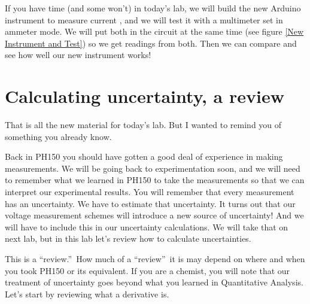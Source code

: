 If you have time (and some won't) in today's lab, we will build the new
Arduino instrument to measure current , and we will test it with a
multimeter set in ammeter mode. We will put both in the circuit at the same
time (see figure \ref{New Instrument and Test}) so we get readings from
both. Then we can compare and see how well our new instrument works!

\section{Calculating uncertainty, a review}

That is all the new material for today's lab. But I wanted to remind you of
something you already know.

Back in PH150 you should have gotten a good deal of experience in making
measurements. We will be going back to experimentation soon, and we will
need to remember what we learned in PH150 to take the measurements so that
we can interpret our experimental results. You will remember that every
measurement has an uncertainty. We have to estimate that uncertainty. It
turns out that our voltage measurement schemes will introduce a new source
of uncertainty! And we will have to include this in our uncertainty
calculations. We will take that on next lab, but in this lab let's review
how to calculate uncertainties.

This is a \textquotedblleft review.\textquotedblright\ How much of a
\textquotedblleft review\textquotedblright\ it is may depend on where and
when you took PH150 or its equivalent. If you are a chemist, you will note
that our treatment of uncertainty goes beyond what you learned in
Quantitative Analysis. Let's start by reviewing what a derivative is.

